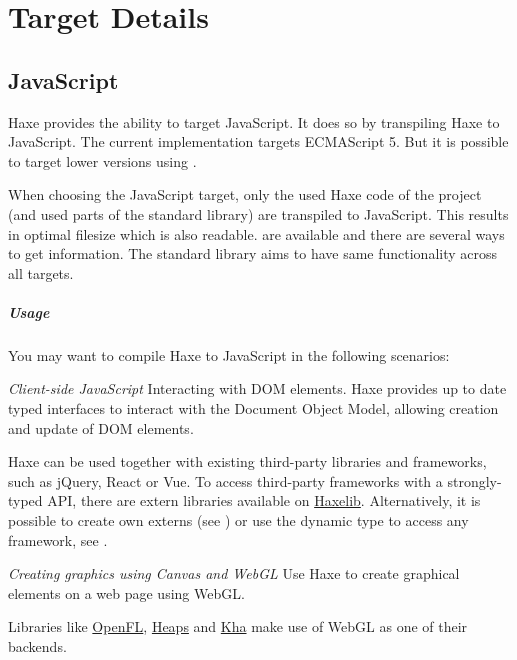 \chapter{Target Details}
\label{target-details}

\section{JavaScript}
\label{target-javascript}

Haxe provides the ability to target JavaScript. It does so by transpiling Haxe to JavaScript. The current implementation targets ECMAScript 5. But it is possible to target lower versions using .

When choosing the JavaScript target, only the used Haxe code of the project (and used parts of the standard library) are transpiled to JavaScript. This results in optimal filesize which is also readable.  are available and there are several ways to get  information. The standard library aims to have same functionality across all targets.

\paragraph{Usage}

You may want to compile Haxe to JavaScript in the following scenarios:

\emph{Client-side JavaScript}
Interacting with DOM elements. Haxe provides up to date typed interfaces to interact with the Document Object Model, allowing creation and update of DOM elements. 

Haxe can be used together with existing third-party libraries and frameworks, such as jQuery, React or Vue. To access third-party frameworks with a strongly-typed API, there are extern libraries available on \href{http://lib.haxe.org/t/js/}{Haxelib}. Alternatively, it is possible to create own externs (see ) or use the dynamic type to access any framework, see .

\emph{Creating graphics using Canvas and WebGL}
Use Haxe to create graphical elements on a web page using WebGL. 

Libraries like \href{http://www.openfl.org/}{OpenFL}, \href{http://heaps.io/}{Heaps} and \href{http://kha.tech/}{Kha} make use of WebGL as one of their backends.

